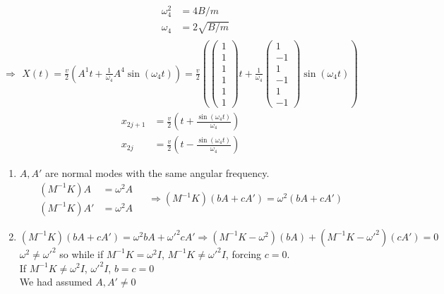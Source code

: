 \documentclass[twoside,10pt]{amsart}
\newcommand{\problemhead}[1]
  {\smallskip
   \noindent{\large\bf Problem #1.}
   \smallskip}
\begin{document}
\begin{enumerate}
\[\begin{gathered}
\begin{aligned}
\end{aligned}  \quad \quad \, \begin{aligned} 
  \omega_4^2 & = 4B/m \\
  \omega_4 & = 2 \sqrt{B/m }
\end{aligned} 
\end{gathered}
\]
\[
\Longrightarrow \begin{gathered} 
  X(t) = \frac{v}{2}(A^1 t + \frac{1}{\omega_4} A^4 \sin{(\omega_4 t) } ) = \frac{v}{2} \left( \left( \begin{matrix} 1 \\ 1 \\ 1 \\ 1 \\ 1 \\ 1 \end{matrix} \right) t + \frac{1 }{\omega_4} \left( \begin{matrix} 1 \\ -1 \\ 1 \\ -1 \\ 1 \\ -1 \end{matrix} \right) \sin{(\omega_4 t) } \right) 
\end{gathered}
\]
\[
  \begin{aligned}
    x_{2j+1} & = \frac{v}{2} \left( t + \frac{\sin{ (\omega_4 t) } }{ \omega_4 } \right) \\
    x_{2j} & = \frac{v}{2} \left( t - \frac{\sin{(\omega_4 t) } }{\omega_4} \right)
\end{aligned}
\]
\end{enumerate}

\problemhead{4.3}
\begin{enumerate}
\item $A, A'$ are normal modes with the same angular frequency.  
\[
\begin{aligned}
  (M^{-1}K) A & = \omega^2 A \\
  (M^{-1}K) A' & = \omega^2 A 
\end{aligned} \quad \, \Longrightarrow (M^{-1} K) (bA + cA') = \omega^2 (bA + cA') 
\]
\item 
\[
(M^{-1}K)(bA + cA') = \omega^2 bA + \omega'^2 cA' \Longrightarrow (M^{-1}K - \omega^2)(bA) + (M^{-1} K - \omega'^2 )(cA') = 0 
\]
$\omega^2 \neq \omega'^2 $ so while if $M^{-1}K = \omega^2 I$, $M^{-1}K \neq \omega'^2 I$, forcing $c=0$.  \smallskip \\
If $M^{-1}K \neq \omega^2 I$, $\omega'^2 I$, $b=c=0$ \medskip \\
We had assumed $A,A' \neq 0$
\end{enumerate}
\end{document}
